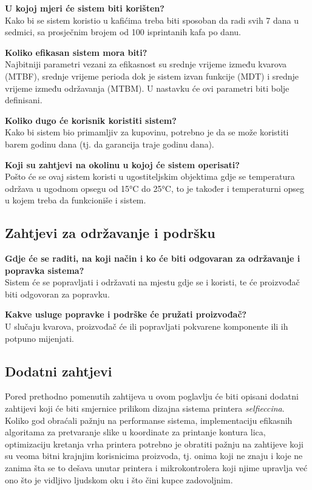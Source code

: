 \documentclass[12pt]{article}
\begin{document}
\textbf{U kojoj mjeri će sistem biti korišten?}\\
Kako bi se sistem koristio u kafićima treba biti sposoban da radi svih 7 dana u sedmici, sa prosječnim brojem od 100 isprintanih kafa po danu.

\textbf{Koliko efikasan sistem mora biti?}\\
Najbitniji parametri vezani za efikasnost su srednje vrijeme između kvarova (MTBF), srednje vrijeme perioda dok je sistem izvan funkcije (MDT) i srednje vrijeme između održavanja (MTBM). U nastavku će ovi parametri biti bolje definisani.

\textbf{Koliko dugo će korisnik koristiti sistem?}\\
Kako bi sistem bio primamljiv za kupovinu, potrebno je da se može koristiti barem godinu dana (tj. da garancija traje godinu dana).

\textbf{Koji su zahtjevi na okolinu u kojoj će sistem operisati?}\\
Pošto će se ovaj sistem koristi u ugostiteljskim objektima gdje se temperatura održava u ugodnom opsegu od 15°C do 25°C, to je također i temperaturni opseg u kojem treba da funkcioniše i sistem.

\newpage

\subsection{Zahtjevi za održavanje i podršku}
\textbf{Gdje će se raditi, na koji način i ko će biti odgovaran za održavanje i popravka sistema?}\\
Sistem će se popravljati i održavati na mjestu gdje se i koristi, te će proizvođač biti odgovoran za popravku.

\textbf{Kakve usluge popravke i podrške će pružati proizvođač?}\\
U slučaju kvarova, proizvođač će ili popravljati pokvarene komponente ili ih potpuno mijenjati. 

\subsection{Dodatni zahtjevi}
Pored prethodno pomenutih zahtijeva u ovom poglavlju \'ce biti opisani dodatni zahtijevi koji \'ce biti smjernice prilikom dizajna sistema printera \textit{selfieccina}. Koliko god obra\'cali pa\v{z}nju na performanse sistema, implementaciju efikasnih algoritama za pretvaranje slike u koordinate za printanje kontura lica, optimizaciju kretanja vrha printera potrebno je obratiti pa\v{z}nju na zahtijeve koji su veoma bitni krajnjim korisnicima proizvoda, tj. onima koji ne znaju i koje ne zanima \v{s}ta se to de\v{s}ava unutar printera i mikrokontrolera koji njime upravlja ve\'c ono \v{s}to je vidljivo ljudskom oku i \v{s}to \v{c}ini kupce zadovoljnim.
\end{document}
